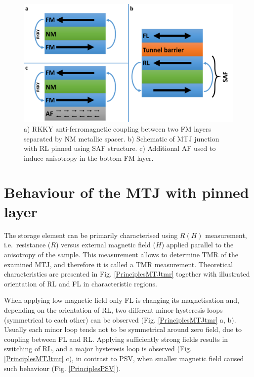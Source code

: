     \begin{figure}[H]
        \centering
        \includegraphics[width=0.75\paperwidth, page=1]{img/03/Pinning.pdf}
        \caption{a) RKKY anti-ferromagnetic coupling between two FM layers separated by NM metallic spacer. b) Schematic of MTJ junction with RL pinned using SAF structure. c) Additional AF used to induce anisotropy in the bottom FM layer.}
        \label{PrinciplesSAF}
    \end{figure} 
    
\section{Behaviour of the MTJ with pinned layer}
\label{sec:PrinciplesRHmeas}   
    The storage element can be primarily characterised using $R(H)$ measurement, i.e.\ resistance ($R$) versus external magnetic field ($H$) applied parallel to the anisotropy of the sample. This measurement allows to determine TMR of the examined MTJ, and therefore it is called a TMR measurement. Theoretical characteristics are presented in Fig. \ref{PrinciplesMTJtmr} together with illustrated orientation of RL and FL in characteristic regions.
    
    When applying low magnetic field only FL is changing its magnetisation and, depending on the orientation of RL, two different minor hysteresis loops (symmetrical to each other) can be observed (Fig. \ref{PrinciplesMTJtmr} a, b). Usually each minor loop tends not to be symmetrical around zero field, due to coupling between FL and RL. Applying sufficiently strong fields results in switching of RL, and a major hysteresis loop is observed (Fig. \ref{PrinciplesMTJtmr} c), in contrast to PSV, when smaller magnetic field caused such behaviour (Fig. \ref{PrinciplesPSV}).
    
